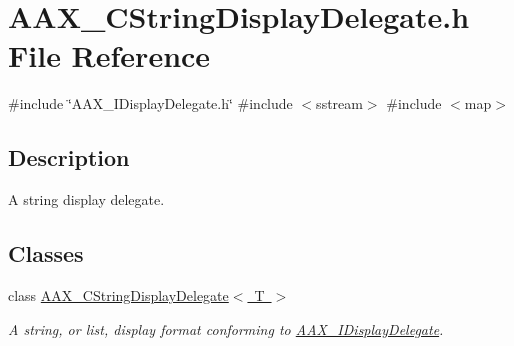 \hypertarget{a00479}{}\section{A\+A\+X\+\_\+\+C\+String\+Display\+Delegate.\+h File Reference}
\label{a00479}
{\ttfamily \#include \char`\"{}A\+A\+X\+\_\+\+I\+Display\+Delegate.\+h\char`\"{}}\newline
{\ttfamily \#include $<$sstream$>$}\newline
{\ttfamily \#include $<$map$>$}\newline


\subsection{Description}
A string display delegate. 

\subsection*{Classes}
\begin{DoxyCompactItemize}
\item 
class \mbox{\hyperlink{a01581}{A\+A\+X\+\_\+\+C\+String\+Display\+Delegate$<$ T $>$}}
\begin{DoxyCompactList}\small\item\em A string, or list, display format conforming to \mbox{\hyperlink{a01801}{A\+A\+X\+\_\+\+I\+Display\+Delegate}}. \end{DoxyCompactList}\end{DoxyCompactItemize}
